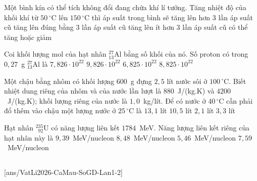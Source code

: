 	\begin{ex}%
		Một bình kín có thể tích không đổi đang chứa khí lí tưởng. Tăng nhiệt độ của khối khí từ $50\,^\circ\text{C}$ lên $150\,^\circ\text{C}$ thì áp suất trong bình sẽ
		\choice
		{tăng lên hơn $3$ lần áp suất cũ}
		{tăng lên đúng bằng $3$ lần áp suất cũ}
		{\True tăng lên ít hơn $3$ lần áp suất cũ}
		{có thể tăng hoặc giảm}
	\end{ex}

	\begin{ex}%
		Coi khối lượng mol của hạt nhân ${}^{27}_{13}\text{Al}$ bằng số khối của nó. Số proton có trong $0{,}27$~g ${}^{27}_{13}\text{Al}$ là
		\choice
		{\True $7{,}826\cdot 10^{22}$}
		{$9{,}826\cdot 10^{22}$}
		{$6{,}825\cdot 10^{22}$}
		{$8{,}825\cdot 10^{22}$}
	\end{ex}

	\begin{ex}%
		Một chậu bằng nhôm có khối lượng $600$~g đựng $2{,}5$ lít nước sôi ở $100\,^\circ\text{C}$. Biết nhiệt dung riêng của nhôm và của nước lần lượt là $880$~J/(kg.K) và $4200$~J/(kg.K); khối lượng riêng của nước là $1{,}0$~kg/lít. Để có nước ở $40\,^\circ\text{C}$ cần phải đổ thêm vào chậu một lượng nước ở $25\,^\circ\text{C}$ là
		\choice
		{$13{,}1$ lít}
		{\True $10{,}5$ lít}
		{$2{,}1$ lít}
		{$3{,}3$ lít}
	\end{ex}

	\begin{ex}%
		Hạt nhân $^{235}_{\phantom{2}92}\text{U}$ có năng lượng liên kết $1784$~MeV. Năng lượng liên kết riêng của hạt nhân này là
		\choice
		{$9{,}39$~MeV/nucleon}
		{$8{,}48$~MeV/nucleon}
		{$5{,}46$~MeV/nucleon}
		{\True $7{,}59$~MeV/nucleon}
	\end{ex}

	\subsection*{}
	\setcounter{ex}{0}
	[ans/VatLi2026-CaMau-SoGD-Lan1-2]

